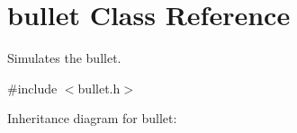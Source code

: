 \hypertarget{classbullet}{}\section{bullet Class Reference}
\label{classbullet}


Simulates the bullet.  




{\ttfamily \#include $<$bullet.\+h$>$}



Inheritance diagram for bullet\+:
